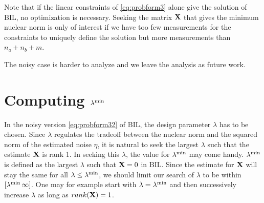 \documentclass{ifacconf}
\newcommand{\X}{{\bf X}}
\newcommand{\0}{{\bf 0}}
\begin{document}
Note that if the linear constraints of
\eqref{eq:probform3} alone give the solution of BIL, no optimization
is necessary. Seeking the
matrix $\X$ that gives the minimum nuclear norm is only of interest if
we have too few measurements for the constraints to uniquely define
the solution but more
measurements than
$n_a+n_b+m$.





The noisy case is harder to analyze and we leave the analysis as
future work.

\section{Computing $\lambda^{\text{\MakeLowercase{min}}}$}
In the noisy version \eqref{eq:probform32} of BIL, the design parameter $\lambda$ has to be
chosen. Since $\lambda$ regulates the tradeoff between the nuclear
norm and the squared norm of the estimated noise $\eta$, it is natural
to seek the largest $\lambda$ such that the estimate $\X$ is rank
1. In seeking this $\lambda$, the value for $\lambda
^{\text{\MakeLowercase{min}}}$ may come handy. $\lambda
^{\text{\MakeLowercase{min}}}$ is defined as the largest $\lambda$
such that $\X=0$ in BIL. Since the estimate for $\X$ will stay the
same for all $\lambda \leq \lambda
^{\text{\MakeLowercase{min}}}$, we should limit our search of
$\lambda$ to be within  $[\lambda
^{\text{\MakeLowercase{min}}} \, \infty]$. One may for example start
with $\lambda=\lambda
^{\text{\MakeLowercase{min}}} $ and then successively increase
$\lambda$ as long as $rank(\X)=1$. 
\end{document}
